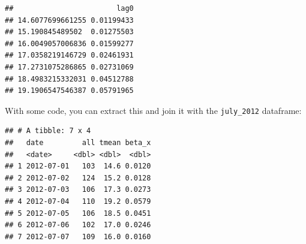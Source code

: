 \documentclass[
]{book}
\newenvironment{Shaded}{\begin{snugshade}}{\end{snugshade}}
\newcommand{\AttributeTok}[1]{\textcolor[rgb]{0.13,0.29,0.53}{#1}}
\newcommand{\DecValTok}[1]{\textcolor[rgb]{0.00,0.00,0.81}{#1}}
\newcommand{\FunctionTok}[1]{\textcolor[rgb]{0.13,0.29,0.53}{\textbf{#1}}}
\newcommand{\NormalTok}[1]{#1}
\newcommand{\OtherTok}[1]{\textcolor[rgb]{0.56,0.35,0.01}{#1}}
\newcommand{\SpecialCharTok}[1]{\textcolor[rgb]{0.81,0.36,0.00}{\textbf{#1}}}
\newcommand{\StringTok}[1]{\textcolor[rgb]{0.31,0.60,0.02}{#1}}
\begin{document}
\begin{Shaded}
\end{Shaded}

\begin{verbatim}
##                        lag0
## 14.6077699661255 0.01199433
## 15.190845489502  0.01275503
## 16.0049057006836 0.01599277
## 17.0358219146729 0.02461931
## 17.2731075286865 0.02731069
## 18.4983215332031 0.04512788
## 19.1906547546387 0.05791965
\end{verbatim}

With some code, you can extract this and join it with the \texttt{july\_2012} dataframe:

\begin{Shaded}
\end{Shaded}

\begin{verbatim}
## # A tibble: 7 x 4
##   date         all tmean beta_x
##   <date>     <dbl> <dbl>  <dbl>
## 1 2012-07-01   103  14.6 0.0120
## 2 2012-07-02   124  15.2 0.0128
## 3 2012-07-03   106  17.3 0.0273
## 4 2012-07-04   110  19.2 0.0579
## 5 2012-07-05   106  18.5 0.0451
## 6 2012-07-06   102  17.0 0.0246
## 7 2012-07-07   109  16.0 0.0160
\end{verbatim}
\end{document}
